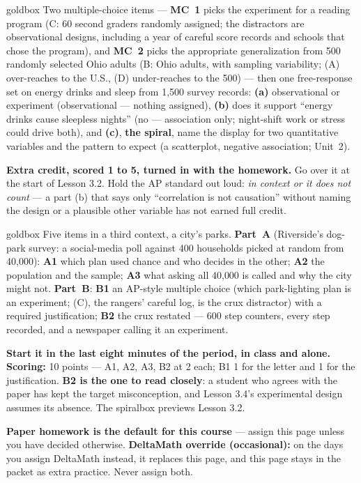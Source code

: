 \documentclass[10pt]{article}
\begin{document}
\boxguard
\begin{skillbox}{goldbox}
Two multiple-choice items --- \textbf{MC~1} picks the experiment for a reading program (C: 60
second graders randomly assigned; the distractors are observational designs, including a
year of careful score records and schools that chose the program), and \textbf{MC~2} picks the
appropriate generalization from 500 randomly selected Ohio adults (B: Ohio adults, with
sampling variability; (A) over-reaches to the U.S., (D) under-reaches to the 500) --- then one
free-response set on energy drinks and sleep from 1{,}500 survey records: \textbf{(a)}
observational or experiment (observational --- nothing assigned), \textbf{(b)} does it support
``energy drinks cause sleepless nights'' (no --- association only; night-shift work or stress
could drive both), and \textbf{(c)}, \textbf{the spiral}, name the display for two
quantitative variables and the pattern to expect (a scatterplot, negative association;
Unit~2).

\textbf{Extra credit, scored 1 to 5, turned in with the homework.} Go over it at the start of
Lesson 3.2. Hold the AP standard out loud: \emph{in context or it does not count} --- a part (b)
that says only ``correlation is not causation'' without naming the design or a plausible
other variable has not earned full credit.
\end{skillbox}

\boxguard
\begin{skillbox}{goldbox}
Five items in a third context, a city's parks. \textbf{Part~A} (Riverside's dog-park survey: a
social-media poll against 400 households picked at random from 40{,}000): \textbf{A1} which
plan used chance and who decides in the other; \textbf{A2} the population and the sample;
\textbf{A3} what asking all 40{,}000 is called and why the city might not. \textbf{Part~B}:
\textbf{B1} an AP-style multiple choice (which park-lighting plan is an experiment; (C), the
rangers' careful log, is the crux distractor) with a required justification; \textbf{B2} the
crux restated --- 600 step counters, every step recorded, and a newspaper calling it an
experiment.

\textbf{Start it in the last eight minutes of the period, in class and alone.}
\textbf{Scoring:} 10 points --- A1, A2, A3, B2 at 2 each; B1 1 for the letter and 1 for the
justification. \textbf{B2 is the one to read closely}: a student who agrees with the paper has
kept the target misconception, and Lesson 3.4's experimental design assumes its absence. The
spiralbox previews Lesson 3.2.

\textbf{Paper homework is the default for this course} --- assign this page unless you have
decided otherwise. \textbf{DeltaMath override (occasional):} on the days you assign DeltaMath
instead, it replaces this page, and this page stays in the packet as extra practice. Never
assign both.
\end{skillbox}
\end{document}
